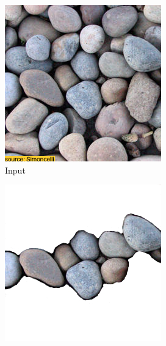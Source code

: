 \begin{figure}[]
    \centering    
    \begin{subfigure}{\textwidth}
        \centering
        \begin{subfigure}{0.24\textwidth}
            \centering
            \includegraphics[width=\textwidth]{images/04-experiment01/pebbles/target.jpg}
            \caption{Input}
            \label{fig:ex01-pebbles-5steps-some_target}
        \end{subfigure}
        \hfill
        \begin{subfigure}{0.24\textwidth}
            \centering
            \includegraphics[width=\textwidth]{images/04-experiment01/pebbles/some_bg.jpg}

\end{subfigure}
\end{subfigure}
\end{figure}
